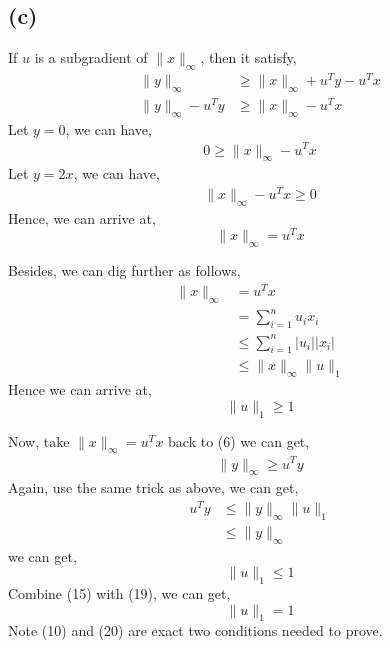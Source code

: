 \documentclass[12pt, a4 paper]{article}
\begin{document}
\begin{framed}
        \subsection{(c)}
        If $u$ is a subgradient of $\lVert x \rVert_{\infty}$, then 
        it satisfy,
        \begin{align}
            \lVert y \rVert_{\infty} &\geq \lVert x \rVert_{\infty} +
            u^{T}y - u^{T}x\\
            \lVert y \rVert_{\infty} - u^{T}y &\geq \lVert x \rVert_{\infty}
            - u^{T}x
        \end{align}
        \indent Let $y=0$, we can have,
        \begin{align}
            0 \geq \lVert x \rVert_{\infty} - u^{T}x
        \end{align}
        \indent Let $y=2x$, we can have,
        \begin{align}
            \lVert x \rVert_{\infty} - u^{T}x \geq 0
        \end{align}
        \indent Hence, we can arrive at,
        \begin{equation}
            \lVert x \rVert_{\infty} = u^{T}x
        \end{equation}

        \indent Besides, we can dig further as follows,
        \begin{align}
            \lVert x \rVert_{\infty} &= u^{T}x \\
            &= \sum\limits_{i=1}^{n} u_{i}x_{i}\\
            &\leq \sum\limits_{i=1}^{n} \lvert u_{i} \rvert \lvert x_{i} \rvert\\
            &\leq \lVert x \rVert_{\infty} \lVert u \rVert_{1}
        \end{align}
        \indent Hence we can arrive at,
        \begin{equation}
            \lVert u \rVert_{1} \geq 1
        \end{equation}

        \indent Now, take $\lVert x \rVert_{\infty} = u^{T}x$ back to (6) we can
        get,
        \begin{align}
            \lVert y \rVert_{\infty} \geq u^{T}y
        \end{align}
        \indent Again, use the same trick as above, we can get,
        \begin{align}
            u^{T}y &\leq \lVert y \rVert_{\infty} \lVert u \rVert_{1}\\
            &\leq \lVert y \rVert_{\infty}
        \end{align}
        \indent we can get,
        \begin{equation}
            \lVert u \rVert_{1} \leq 1
        \end{equation}
        \indent Combine (15) with (19), we can get,
        \begin{equation}
            \lVert u \rVert_{1} = 1
        \end{equation}
        \indent Note (10) and (20) are exact two conditions
        needed to prove.
    \end{framed}
\end{document}
